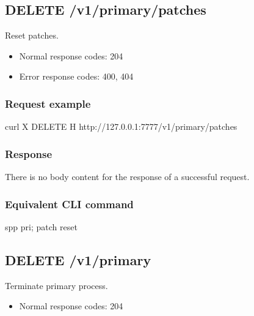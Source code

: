 \documentclass[a4paper,11pt,openany,oneside,english]{sphinxmanual}
\begin{document}
\subsection{DELETE /v1/primary/patches}
\label{\detokenize{api_ref/spp_primary:delete-v1-primary-patches}}
Reset patches.
\begin{itemize}
\item {} 
Normal response codes: 204

\item {} 
Error response codes: 400, 404

\end{itemize}


\subsubsection{Request example}
\label{\detokenize{api_ref/spp_primary:id12}}
\begin{sphinxVerbatim}[commandchars=\\\{\},formatcom=\footnotesize]
 curl \PYGZhy{}X DELETE \PYGZhy{}H  
  http://127.0.0.1:7777/v1/primary/patches
\end{sphinxVerbatim}


\subsubsection{Response}
\label{\detokenize{api_ref/spp_primary:id13}}
There is no body content for the response of a successful  request.


\subsubsection{Equivalent CLI command}
\label{\detokenize{api_ref/spp_primary:id14}}
\begin{sphinxVerbatim}[commandchars=\\\{\},formatcom=\footnotesize]
spp \PYGZgt{} pri; patch reset
\end{sphinxVerbatim}


\subsection{DELETE /v1/primary}
\label{\detokenize{api_ref/spp_primary:delete-v1-primary}}
Terminate primary process.
\begin{itemize}
\item {} 
Normal response codes: 204

\end{itemize}
\end{document}
